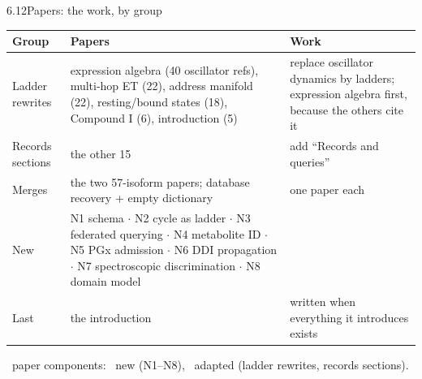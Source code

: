 \documentclass[aspectratio=169,11pt]{beamer}
\renewcommand{\arraystretch}{1.08}
\newcommand{\src}[1]{\par\vfill{\scriptsize\color{black!60}#1\par}}
\begin{document}
\begin{frame}{6.12\quad Papers: the work, by group}
\footnotesize
\setlength\tabcolsep{3.5pt}
\renewcommand{\arraystretch}{1.0}
\begin{tabularx}{\textwidth}{@{}l Y L{50mm}@{}}
\toprule
\textbf{Group} & \textbf{Papers} & \textbf{Work} \\
\midrule
Ladder rewrites & expression algebra (40 oscillator refs), multi-hop ET (22), address manifold (22), resting/bound states (18), Compound I (6), introduction (5) & replace oscillator dynamics by ladders; expression algebra first, because the others cite it \\
Records sections & the other 15 & add ``Records and queries'' \\
Merges & the two 57-isoform papers; database recovery + empty dictionary & one paper each \\
New & N1 schema $\cdot$ N2 cycle as ladder $\cdot$ N3 federated querying $\cdot$ N4 metabolite ID $\cdot$ N5 PGx admission $\cdot$ N6 DDI propagation $\cdot$ N7 spectroscopic discrimination $\cdot$ N8 domain model & \\
Last & the introduction & written when everything it introduces exists \\
\bottomrule
\end{tabularx}
\src{\NLayerPapers\ paper components: \NPapersNew\ new (N1--N8), \NPapersAdapt\ adapted (ladder rewrites, records sections).}
\end{frame}
\end{document}

